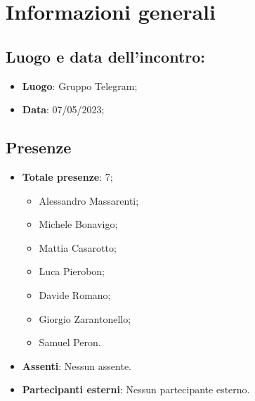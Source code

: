 \section{Informazioni generali}
    \subsection{Luogo e data dell'incontro:}
    \begin{itemize}
        \item \textbf{Luogo}: Gruppo Telegram;
        \item \textbf{Data}: 07/05/2023;
    \end{itemize}
    \subsection{Presenze}
    \begin{itemize}
        \item \textbf{Totale presenze}: 7;
        \begin{itemize}
            \item Alessandro Massarenti;
            \item Michele Bonavigo;
            \item Mattia Casarotto;
            \item Luca Pierobon;
            \item Davide Romano;
            \item Giorgio Zarantonello;
            \item Samuel Peron.
        \end{itemize}
        \item \textbf{Assenti}: Nessun assente.
        \item \textbf{Partecipanti esterni}: Nessun partecipante esterno.
    \end{itemize}
